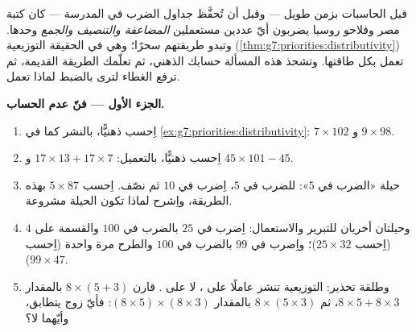 \begin{problem}
\label{pb:g7:priorities:1}
قبل الحاسبات بزمن طويل --- وقبل أن تُحفَّظ جداول الضرب
في المدرسة --- كان كتبة مصر وفلاحو روسيا
يضربون أيّ عددين مستعملين \emph{المضاعفة والتنصيف
والجمع} وحدها. وتبدو طريقتهم سحرًا؛ وهي في الحقيقة
التوزيعية (\cref{thm:g7:priorities:distributivity}) تعمل
بكل طاقتها. وتشحذ هذه المسألة حسابك الذهني، ثم
تعلّمك الطريقة القديمة، ثم ترفع الغطاء لترى بالضبط
لماذا تعمل.

\medskip
\noindent\textbf{الجزء الأول --- فنّ عدم الحساب.}
\begin{enumerate}
  \item اِحسب ذهنيًّا، بالنشر كما في
        \cref{ex:g7:priorities:distributivity}:
        $7 \times 102$ و $9 \times 98$.
  \item اِحسب ذهنيًّا، بالتعميل:
        $17 \times 13 + 17 \times 7$ و
        $45 \times 101 - 45$.
  \item حيلة «الضرب في $5$»: للضرب في $5$، اِضرب في
        $10$ ثم نصّف. اِحسب $5 \times 87$ بهذه الطريقة،
        واِشرح لماذا تكون الحيلة مشروعة.
  \item وحيلتان أخريان للتبرير والاستعمال: اِضرب في $25$
        بالضرب في $100$ والقسمة على $4$ (اِحسب
        $25 \times 32$)؛ واِضرب في $99$ بالضرب في $100$
        والطرح مرة واحدة (اِحسب $99 \times 47$).
  \item وطلقة تحذير: التوزيعية تنشر عاملًا على
        \emph{}، لا على . قارن
        $8 \times (5 + 3)$ بالمقدار $8 \times 5 + 8 \times 3$، ثم
        $8 \times (5 \times 3)$ بالمقدار
        $(8 \times 5) \times (8 \times 3)$: فأيّ زوج يتطابق،
        وأيّهما لا؟
\end{enumerate}


\end{problem}
